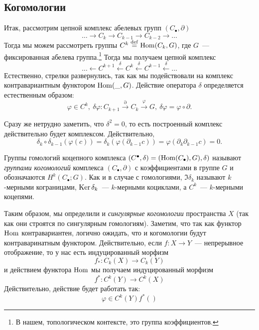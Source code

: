     \subsection{Когомологии}

    Итак, рассмотрим цепной комплекс абелевых групп $(C_{\bullet}, \partial)$
    \[ \ldots \to C_{k} \to C_{k - 1} \to C_{k - 2} \to \ldots \]
    Тогда мы можем рассмотреть группы $C^{k} \eqdef \Hom\lr*{C_{k}, G}$, где $G$~--- фиксированная абелева группа.\footnote{В нашем, топологическом контексте, это группа коэффициентов.}
    Тогда мы получаем цепной комплекс
    \[ \ldots \leftarrow C^{k + 1} \xleftarrow{\delta} C^{k} \xleftarrow{\delta} C^{k - 1} \xleftarrow{\delta} \ldots \]
    Естественно, стрелки развернулись, так как мы подействовали на комплекс контравариантным функтором $\operatorname{Hom}(\_, G)$.
    Действие оператора $\delta$ определяется естественным образом:
    \[ \varphi \in C^{k}, \ \delta\varphi\colon C_{k + 1} \xrightarrow{\partial} C_{k} \xrightarrow{\varphi} G, \ \delta\varphi = \varphi \circ \partial. \]
    \begin{remark}
       Сразу же нетрудно заметить, что $\delta^2 = 0$, то есть построенный комплекс действительно будет комплексом. Действительно,
        \[ \delta_{k} \circ \delta_{k - 1}(\varphi(c)) = \delta_k(\varphi(\partial_{k - 1}c)) = \varphi(\partial_{k}\partial_{k - 1}c) = 0. \]
    \end{remark}

    \begin{definition}
        Группы гомологий коцепного комплекса $(C^{\bullet}, \delta) = (\operatorname{Hom}(C_{\bullet}), G), \delta)$ называют \emph{группами когомологий} комплекса $(C_{\bullet}, \partial)$ с коэффициентами в группе $G$ и обозначаются
    $H^{k}(C_{\bullet}; G)$. Как и в случае с гомологиями, $\Im{\delta_k}$ называют $k$-мерными кограницами, $\operatorname{Ker}{\delta_{k}}$~--- $k$-мерными коциклами, а  $C^k$~--- $k$-мерными коцепями.
    \end{definition}

    Таким образом, мы определили и \emph{сингулярные когомологии} пространства  $X$ (так как они строятся по сингулярным гомологиям).
    Заметим, что так как функтор $\operatorname{Hom}$ контравариантен, логично ожидать, что и когомологии будут контраваринатным функтором. Действительно,
    если $f\colon X \to Y$~--- непрерывное отображение, то у нас есть индуцированный морфизм
    \[ f_{*} \colon C_{k}(X) \to C_{k}(Y) \]
    и действием функтора $\operatorname{Hom}$ мы получаем индуцированный морфизм
    \[ f^{*}\colon C^{k}(Y) \to C^{k}(X) \]
    Действительно, действие будет работать так:
    \[ \varphi \in C^{k}(Y) f^{*}()\]

    


